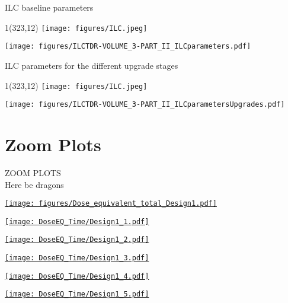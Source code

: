\documentclass[xcolor={dvipsnames}]{beamer}
\newcommand{\ilclogo}{
  \setlength{\TPHorizModule}{1pt}
  \setlength{\TPVertModule}{1pt}
  \begin{textblock}{1}(323,12)
   \texttt{[image: figures/ILC.jpeg]}
  \end{textblock}
}
\begin{document}
\begin{frame}{ILC baseline parameters}
\ilclogo
\centering
	\texttt{[image: figures/ILCTDR-VOLUME\_3-PART\_II\_ILCparameters.pdf]}
\end{frame}
\begin{frame}{ILC parameters for the different upgrade stages}
\ilclogo
\centering
	\texttt{[image: figures/ILCTDR-VOLUME\_3-PART\_II\_ILCparametersUpgrades.pdf]}
\end{frame}

\section{Zoom Plots}
\begin{frame}
  \begin{center}
    \huge
    ZOOM PLOTS\\
    \tiny
    Here be dragons
  \end{center}
\end{frame}
\begin{frame}[plain]
 \hypertarget{Dose_equivalent_Design1}{\hyperlink{coolingtimesprev_Design1}{\texttt{[image: figures/Dose\_equivalent\_total\_Design1.pdf]}}}
\end{frame}
\begin{frame}[plain]
 \hypertarget{Dose_equivalent_minute_Design1}{\hyperlink{coolingtimesprev_Design1}{\texttt{[image: DoseEQ\_Time/Design1\_1.pdf]}}}
\end{frame}
\begin{frame}[plain]
 \hypertarget{Dose_equivalent_hour_Design1}{\hyperlink{coolingtimesprev_Design1}{\texttt{[image: DoseEQ\_Time/Design1\_2.pdf]}}}
\end{frame}
\begin{frame}[plain]
 \hypertarget{Dose_equivalent_day_Design1}{\hyperlink{coolingtimesprev_Design1}{\texttt{[image: DoseEQ\_Time/Design1\_3.pdf]}}}
\end{frame}
\begin{frame}[plain]
 \hypertarget{Dose_equivalent_month_Design1}{\hyperlink{coolingtimesprev_Design1}{\texttt{[image: DoseEQ\_Time/Design1\_4.pdf]}}}
\end{frame}
\begin{frame}[plain]
 \hypertarget{Dose_equivalent_year_Design1}{\hyperlink{coolingtimesprev_Design1}{\texttt{[image: DoseEQ\_Time/Design1\_5.pdf]}}}
\end{frame}
\end{document}
